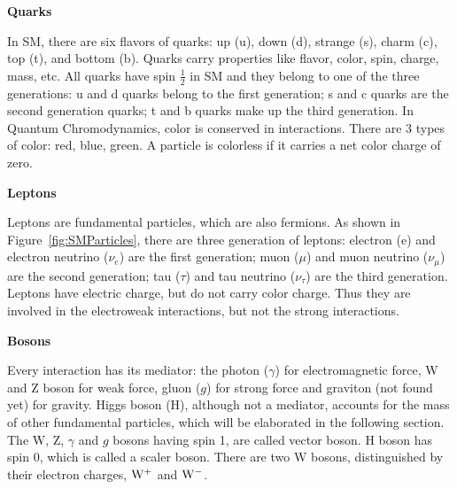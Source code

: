 {\bf Quarks}

In SM, there are six flavors of quarks: up (u), down (d), strange (s), charm (c), top (t), and bottom (b).  
Quarks carry properties like flavor, color, spin, charge, mass, etc. All quarks have spin $\frac{1}{2}$ in SM and they belong to one of the three generations: u and d quarks belong to the first generation; s and c quarks are the second generation quarks; t and b quarks 
make up the third generation. %
In Quantum Chromodynamics, color is conserved in interactions. 
There are 3 types of color: red, blue, green. A particle is colorless if it carries a net color 
charge of zero. 
  

{\bf Leptons}

Leptons are fundamental particles, which are also fermions. 
As shown in Figure~\ref{fig:SMParticles}, there are three generation of leptons: electron (e) and electron neutrino ($\nu_e$) are the first generation; 
muon ($\mu$) and muon neutrino ($\nu_\mu$) are the second generation; 
tau ($\tau$) and tau neutrino ($\nu_\tau$) are the third generation.  Leptons 
have electric charge,  but do not 
carry color charge. Thus they are involved in the electroweak interactions, but not the
strong interactions. 

{\bf Bosons}

Every interaction has its mediator: the photon ($\gamma$) for electromagnetic force,  W and Z boson for weak force, gluon ($g$) for strong force and 
graviton (not found yet) for gravity. Higgs boson (H), although not a mediator, 
accounts for the mass of other fundamental particles, which will be elaborated in the following section. 
The W, Z, $\gamma$ and $g$ bosons having spin 1, are called vector boson. H boson has spin 0, which is called a scaler boson. 
There are two W bosons, distinguished by their electron charges,  ${\rm W^+}$ and ${\rm W^-}$. 






